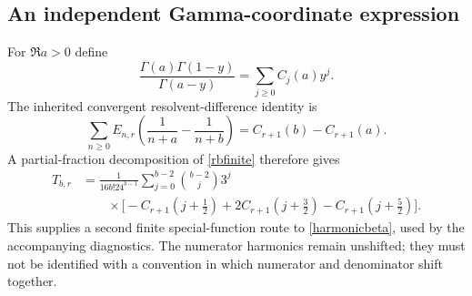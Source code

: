 \documentclass[11pt]{article}
\numberwithin{equation}{section}
\theoremstyle{definition}\newtheorem{definition}[theorem]{Definition}
\theoremstyle{remark}\newtheorem{remark}[theorem]{Remark}
\begin{document}
\subsection{An independent Gamma-coordinate expression}
For $\Re a>0$ define
\[
 \frac{\Gamma(a)\Gamma(1-y)}{\Gamma(a-y)}
 =\sum_{j\ge0}C_j(a)y^j.
\]
The inherited convergent resolvent-difference identity is
\[
 \sum_{n\ge0}E_{n,r}\left(\frac1{n+a}-\frac1{n+b}\right)
 =C_{r+1}(b)-C_{r+1}(a).
\]
A partial-fraction decomposition of \eqref{rbfinite} therefore gives
\begin{equation}\label{harmonicgamma}
\begin{split}
 T_{b,r}&=\frac1{16b!24^{b-1}}\sum_{j=0}^{b-2}\binom{b-2}{j}3^j\\
 &\qquad\times\bigl[-C_{r+1}(j+\tfrac12)+2C_{r+1}(j+\tfrac32)
       -C_{r+1}(j+\tfrac52)\bigr].
\end{split}
\end{equation}
This supplies a second finite special-function route to \eqref{harmonicbeta}, used by the accompanying diagnostics. The numerator harmonics remain unshifted; they must not be identified with a convention in which numerator and denominator shift together.
\end{document}
